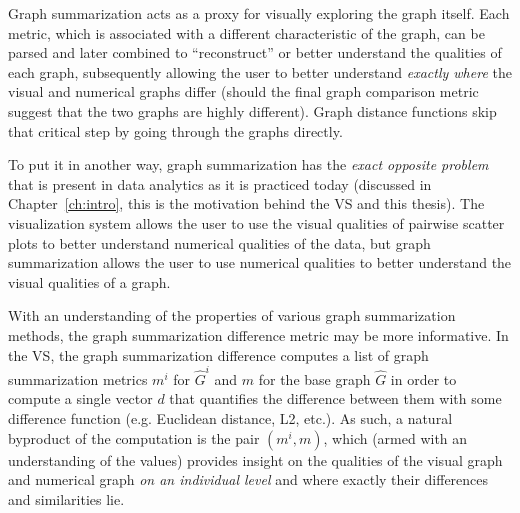 Graph summarization acts as a proxy for visually exploring the graph 
itself. Each metric, which is associated with a different characteristic of the 
graph, can be parsed and later combined to 
``reconstruct'' or better understand the qualities of each graph, subsequently 
allowing the user to better understand \textit{exactly where} the visual and 
numerical graphs differ (should the final graph comparison metric suggest that 
the two graphs are highly different). Graph distance functions skip that 
critical step by going through 
the graphs directly.

To put it in another way, graph summarization has the \textit{exact opposite 
problem} that is present in data analytics as it is practiced today (discussed 
in Chapter~\ref{ch:intro}, this is the motivation behind the VS and this 
thesis). 
The visualization system allows the user to use the visual qualities of pairwise
scatter plots to better understand numerical qualities of the data, but graph 
summarization allows the user to use numerical qualities to better understand 
the visual qualities of a graph. 

With an understanding of the properties of various graph summarization methods, 
the graph summarization difference metric may be more informative. In the VS, 
the graph summarization difference computes a list of graph summarization 
metrics $m^i$ for $\hat{G}^i$ and $m$ for the base graph $\hat{G}$ 
in order to compute a 
single vector $d$ that quantifies the difference between them with 
some difference function (e.g. Euclidean distance, L2, etc.). 
As such, a natural byproduct of the computation is the pair
$(m^i,m)$, which (armed 
with an understanding of the values) provides insight on the qualities of the 
visual graph and numerical graph \textit{on an individual level} and where 
exactly their differences and similarities lie.